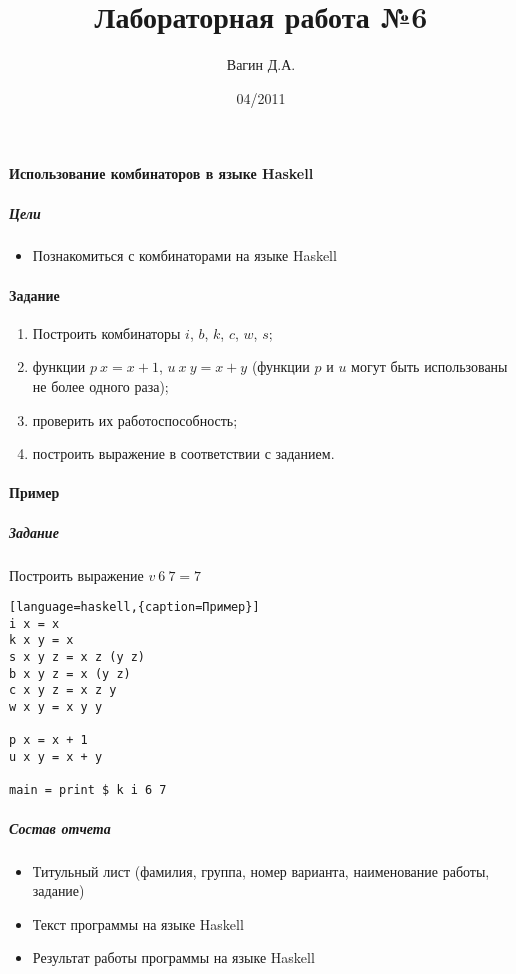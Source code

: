 \documentclass[a4paper,12pt]{article}
\title{Лабораторная работа №6}
\author{Вагин Д.А.}
\date{04/2011}
\begin{document}

\paragraph{Использование комбинаторов в языке Haskell}
\subparagraph{Цели}
\begin{itemize}
	\item Познакомиться с комбинаторами на языке Haskell
\end{itemize}

\paragraph{Задание}
\begin{enumerate}
	\item Построить комбинаторы $i$, $b$, $k$, $c$, $w$, $s$;
	\item функции $p\ x = x + 1$, $u\ x\ y = x + y$ (функции $p$ и $u$ могут быть использованы не более одного раза);
	\item проверить их работоспособность;
	\item построить выражение в соответствии с заданием.
\end{enumerate}

\paragraph{Пример}
\subparagraph{Задание}
Построить выражение 
$v\ 6\ 7 = 7$

\begin{lstlisting}[language=haskell,{caption=Пример}]
i x = x
k x y = x
s x y z = x z (y z)
b x y z = x (y z)
c x y z = x z y
w x y = x y y

p x = x + 1
u x y = x + y

main = print $ k i 6 7
\end{lstlisting}

\subparagraph{Состав отчета}
\begin{itemize}
	\item Титульный лист (фамилия, группа, номер варианта, наименование работы, задание)
	\item Текст программы на языке Haskell
	\item Результат работы программы на языке Haskell
\end{itemize}
\end{document}

